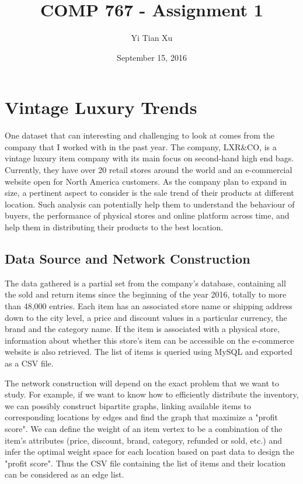 \documentclass[10pt]{article}
\begin{document}
\title{COMP 767 - Assignment 1}
\author{Yi Tian Xu}
\date{September 15, 2016}
\maketitle

\section{Vintage Luxury Trends}

One dataset that can interesting and challenging to look at comes from the company that I worked with in the past year. The company, LXR{\&}CO, is a vintage luxury item company with its main focus on second-hand high end bags. Currently, they have over 20 retail stores around the world and an e-commercial website open for North America customers. As the company plan to expand in size, a pertinent aspect to consider is the sale trend of their products at different location. Such analysis can potentially help them to understand the behaviour of buyers, the performance of physical stores and online platform across time, and help them in distributing their products to the best location. 

\subsection{Data Source and Network Construction}

The data gathered is a partial set from the company's database, containing all the sold and return items since the beginning of the year 2016, totally to more than 48,000 entries. Each item has an associated store name or shipping address down to the city level, a price and discount values in a particular currency, the brand and the category name. If the item is associated with a physical store, information about whether this store's item can be accessible on the e-commerce website is also retrieved. The list of items is queried using MySQL and exported as a CSV file. 

The network construction will depend on the exact problem that we want to study. For example, if we want to know how to efficiently distribute the inventory, we can possibly construct bipartite graphs, linking available items to corresponding locations by edges and find the graph that maximize a "profit score". We can define the weight of an item vertex to be a combination of the item's attributes (price, discount, brand, category, refunded or sold, etc.) and infer the optimal weight space for each location based on past data to design the "profit score". Thus the CSV file containing the list of items and their location can be considered as an edge list. 
\end{document}
